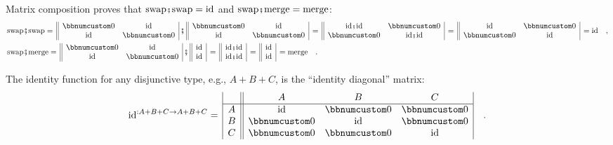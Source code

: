 Matrix composition proves that $\text{swap}\bef\text{swap}=\text{id}$
and $\text{swap}\bef\text{merge}=\text{merge}$:
\begin{align*}
 & \text{swap}\bef\text{swap}=\,\begin{array}{||cc|}
\bbnum 0 & \text{id}\\
\text{id} & \bbnum 0
\end{array}\,\bef\,\begin{array}{||cc|}
\bbnum 0 & \text{id}\\
\text{id} & \bbnum 0
\end{array}\,=\,\begin{array}{||cc|}
\text{id}\bef\text{id} & \bbnum 0\\
\bbnum 0 & \text{id}\bef\text{id}
\end{array}\,=\,\begin{array}{||cc|}
\text{id} & \bbnum 0\\
\bbnum 0 & \text{id}
\end{array}\,=\text{id}\quad,\\
 & \text{swap}\bef\text{merge}=\,\begin{array}{||cc|}
\bbnum 0 & \text{id}\\
\text{id} & \bbnum 0
\end{array}\,\bef\,\begin{array}{||c|}
\text{id}\\
\text{id}
\end{array}\,=\,\begin{array}{||c|}
\text{id}\bef\text{id}\\
\text{id}\bef\text{id}
\end{array}\,=\,\begin{array}{||c|}
\text{id}\\
\text{id}
\end{array}\,=\text{merge}\quad.
\end{align*}

The identity function for any disjunctive type, e.g., $A+B+C$, is
the \textsf{``}identity diagonal\textsf{''} matrix:
\[
\text{id}^{:A+B+C\rightarrow A+B+C}=\,\begin{array}{|c||ccc|}
 & A & B & C\\
\hline A & \text{id} & \bbnum 0 & \bbnum 0\\
B & \bbnum 0 & \text{id} & \bbnum 0\\
C & \bbnum 0 & \bbnum 0 & \text{id}
\end{array}\quad.
\]

